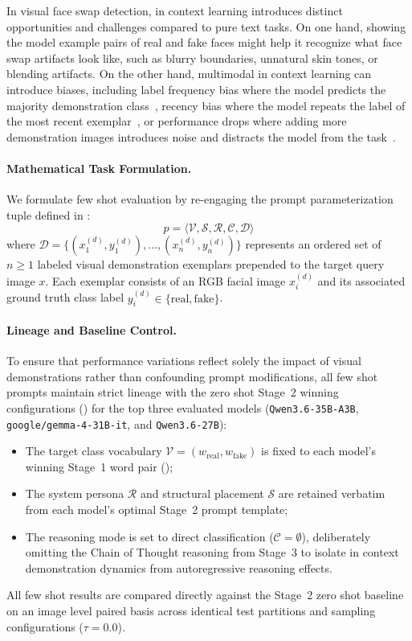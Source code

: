 In visual face swap detection, in context learning introduces distinct opportunities and challenges compared to pure text tasks. On one hand, showing the model example pairs of real and fake faces might help it recognize what face swap artifacts look like, such as blurry boundaries, unnatural skin tones, or blending artifacts. On the other hand, multimodal in context learning can introduce biases, including label frequency bias where the model predicts the majority demonstration class~\cite{baldassini2024whatmakes}, recency bias where the model repeats the label of the most recent exemplar~\cite{tan2024ordermatters,baldassini2024whatmakes,tian2025positionbias}, or performance drops where adding more demonstration images introduces noise and distracts the model from the task~\cite{dogan2026fewmmbench,qin2024whatfactors}.

\paragraph{Mathematical Task Formulation.}
We formulate few shot evaluation by re-engaging the prompt parameterization tuple defined in :
\begin{equation}
    p = \langle \mathcal{V}, \mathcal{S}, \mathcal{R}, \mathcal{C}, \mathcal{D} \rangle
\end{equation}
where $\mathcal{D} = \{(x_1^{(d)}, y_1^{(d)}), \dots, (x_n^{(d)}, y_n^{(d)})\}$ represents an ordered set of $n \ge 1$ labeled visual demonstration exemplars prepended to the target query image $x$. Each exemplar consists of an RGB facial image $x_i^{(d)}$ and its associated ground truth class label $y_i^{(d)} \in \{\text{real}, \text{fake}\}$.

\paragraph{Lineage and Baseline Control.}
To ensure that performance variations reflect solely the impact of visual demonstrations rather than confounding prompt modifications, all few shot prompts maintain strict lineage with the zero shot Stage~2 winning configurations () for the top three evaluated models (\texttt{Qwen3.6-35B-A3B}, \texttt{google/gemma-4-31B-it}, and \texttt{Qwen3.6-27B}):
\begin{itemize}
    \item The target class vocabulary $\mathcal{V} = (w_{\text{real}}, w_{\text{fake}})$ is fixed to each model's winning Stage~1 word pair ();
    \item The system persona $\mathcal{R}$ and structural placement $\mathcal{S}$ are retained verbatim from each model's optimal Stage~2 prompt template;
    \item The reasoning mode is set to direct classification ($\mathcal{C} = \emptyset$), deliberately omitting the Chain of Thought reasoning from Stage~3 to isolate in context demonstration dynamics from autoregressive reasoning effects.
\end{itemize}
All few shot results are compared directly against the Stage~2 zero shot baseline on an image level paired basis across identical test partitions and sampling configurations ($\tau = 0.0$).

